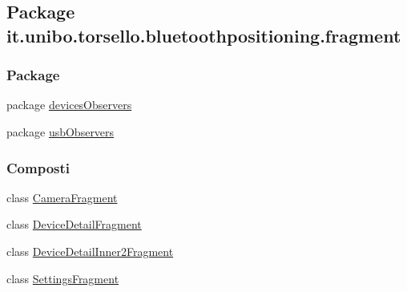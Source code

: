\hypertarget{namespaceit_1_1unibo_1_1torsello_1_1bluetoothpositioning_1_1fragment}{}\subsection{Package it.\+unibo.\+torsello.\+bluetoothpositioning.\+fragment}
\label{namespaceit_1_1unibo_1_1torsello_1_1bluetoothpositioning_1_1fragment}
\subsubsection*{Package}
\begin{DoxyCompactItemize}
\item 
package \hyperlink{namespaceit_1_1unibo_1_1torsello_1_1bluetoothpositioning_1_1fragment_1_1devicesObservers}{devices\+Observers}
\item 
package \hyperlink{namespaceit_1_1unibo_1_1torsello_1_1bluetoothpositioning_1_1fragment_1_1usbObservers}{usb\+Observers}
\end{DoxyCompactItemize}
\subsubsection*{Composti}
\begin{DoxyCompactItemize}
\item 
class \hyperlink{classit_1_1unibo_1_1torsello_1_1bluetoothpositioning_1_1fragment_1_1CameraFragment}{Camera\+Fragment}
\item 
class \hyperlink{classit_1_1unibo_1_1torsello_1_1bluetoothpositioning_1_1fragment_1_1DeviceDetailFragment}{Device\+Detail\+Fragment}
\item 
class \hyperlink{classit_1_1unibo_1_1torsello_1_1bluetoothpositioning_1_1fragment_1_1DeviceDetailInner2Fragment}{Device\+Detail\+Inner2\+Fragment}
\item 
class \hyperlink{classit_1_1unibo_1_1torsello_1_1bluetoothpositioning_1_1fragment_1_1SettingsFragment}{Settings\+Fragment}
\end{DoxyCompactItemize}

